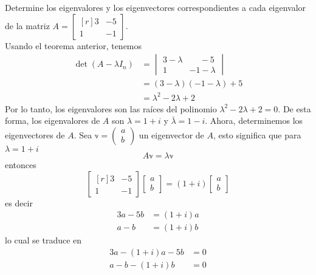 \begin{example}\label{ejemplo_eigenvalores_complejos}
    Determine los eigenvalores y los eigenvectores correspondientes a cada eigenvalor de la matriz $A = \begin{bmatrix*}[r]
        3 & -5 \\
        1 & -1
    \end{bmatrix*}$. \\
    \solucion Usando el teorema anterior, tenemos
    \begin{align*}
        \det(A - \lambda I_n) & = \begin{vmatrix}
            3 - \lambda & \phantom{-} -5 \\
            1 & -1 - \lambda
        \end{vmatrix} \\
        & = (3 - \lambda)(-1 - \lambda) + 5 \\
        & = \lambda^2 - 2\lambda + 2
    \end{align*}
    Por lo tanto, los eigenvalores son las raíces del polinomio $\lambda^2 - 2\lambda + 2 = 0$. De esta forma, los eigenvalores de $A$ son $\lambda = 1 + i$ y $\overline{\lambda} = 1 - i$. Ahora, determinemos los eigenvectores de $A$. Sea $\mathbb{v} = \begin{pmatrix} a \\ b \end{pmatrix}$ un eigenvector de $A$, esto significa que para $\lambda = 1 + i$
    $$A \mathbb{v} = \lambda \mathbb{v}$$
    entonces
    $$\begin{bmatrix*}[r]
        3 & -5 \\
        1 & -1
    \end{bmatrix*} \begin{bmatrix}
        a \\
        b
    \end{bmatrix} = (1 + i) \begin{bmatrix}
        a \\
        b
    \end{bmatrix}$$
    es decir
    \begin{align*}
        3a - 5b & = (1 + i)a \\
        a - b & = (1 + i)b
    \end{align*}
    lo cual se traduce en
    \begin{align*}
        3a - (1 + i)a - 5b & = 0 \\
        a - b - (1 + i)b & = 0
    \end{align*}\newpage\noindent

\end{example}
